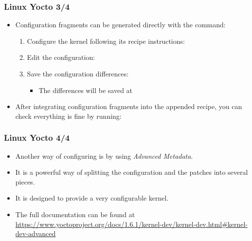 \begin{frame}
  \frametitle{Linux Yocto 3/4}
  \begin{itemize}
    \item Configuration fragments can be generated directly with the
       command:
      \begin{enumerate}
        \item Configure the kernel following its recipe
          instructions: 
        \item Edit the configuration:
        \item Save the configuration differences:
          \begin{itemize}
            \item The differences will be saved at
          \end{itemize}
      \end{enumerate}
    \item After integrating configuration fragments into the appended
      recipe, you can check everything is fine by running:
  \end{itemize}
\end{frame}

\begin{frame}
  \frametitle{Linux Yocto 4/4}
  \begin{itemize}
    \item Another way of configuring  is by using
      \emph{Advanced Metadata}.
    \item It is a powerful way of splitting the configuration and the
      patches into several pieces.
    \item It is designed to provide a very configurable kernel.
    \item The full documentation can be found at
      \url{https://www.yoctoproject.org/docs/1.6.1/kernel-dev/kernel-dev.html\#kernel-dev-advanced}
  \end{itemize}
\end{frame}

